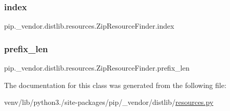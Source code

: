 \subsubsection{\texorpdfstring{index}{index}}
{\footnotesize\ttfamily pip.\+\_\+vendor.\+distlib.\+resources.\+Zip\+Resource\+Finder.\+index}

\mbox{\label{classpip_1_1__vendor_1_1distlib_1_1resources_1_1ZipResourceFinder_a9750de4b476197cebf781f45c96101d6}} 
\subsubsection{\texorpdfstring{prefix\+\_\+len}{prefix\_len}}
{\footnotesize\ttfamily pip.\+\_\+vendor.\+distlib.\+resources.\+Zip\+Resource\+Finder.\+prefix\+\_\+len}



The documentation for this class was generated from the following file\+:\begin{DoxyCompactItemize}
\item 
venv/lib/python3./site-\/packages/pip/\+\_\+vendor/distlib/\hyperlink{resources_8py}{resources.\+py}\end{DoxyCompactItemize}

